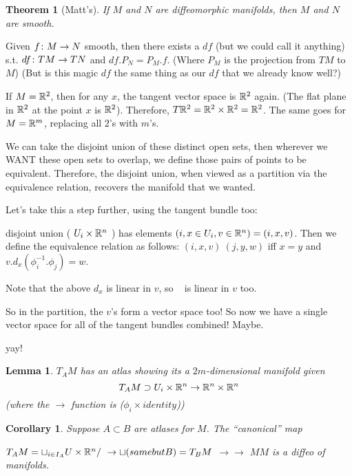 \documentclass[11pt]{amsbook}
\newenvironment{dateenv}{
	\vspace{1em}
}{
	\vspace{1em}
}
\newcommand{\mydate}[4]{
	\newdate{#1}{#2}{#3}{#4}
	\begin{dateenv}
		\hfill\displaydate{#1}
	\end{dateenv}
}
\theoremstyle{mystyle} %
\newtheorem{thrm}[thm]{Theorem}
\newtheorem{coro}[thm]{Corollary}
\newtheorem{lemm}[thm]{Lemma}
\numberwithin{thm}{section}
\newcommand{\x}{\times}
\begin{document}
\begin{thrm}[Matt's]
	If $M$ and $N$ are diffeomorphic manifolds, then $M$ and $N$ are smooth.
\end{thrm}


\mydate{d1}{21}{9}{2016}

Given $f\colon M \to N$ smooth, then there exists a $df$ (but we could call it anything) s.t. $df \colon TM \to TN$ and $df.P_N = P_M.f$.  (Where $P_M$ is the projection from $TM$ to $M$)  (But is this magic $df$ the same thing as our $df$ that we already know well?)

\begin{example}
	If $M = {\mathbb R}^2$, then for any $x$, the tangent vector space is ${\mathbb R}^2$ again.  (The flat plane in ${\mathbb R}^2$ at the point $x$ is ${\mathbb R}^2$).  Therefore, $T{\mathbb R}^2 = {\mathbb R}^2 \times {\mathbb R}^2 = {\mathbb R}^2$.  The same goes for $M = {\mathbb R}^m$, replacing all $2$'s with $m$'s.
\end{example}

We can take the disjoint union of these distinct open sets, then wherever we WANT these open sets to overlap, we define those pairs of points to be equivalent.  Therefore, the disjoint union, when viewed as a partition via the equivalence relation, recovers the manifold that we wanted.

Let's take this a step further, using the tangent bundle too:

disjoint union ( $U_i \times {\mathbb R}^n$ ) has elements $(i, x \in U_i, v \in {\mathbb R}^n) = (i, x, v)$.
Then we define the equivalence relation as follows:
$(i, x, v) ~ (j, y, w)$ iff $x=y$ and $v.d_x(\phi_i^{-1}.\phi_j) = w$.

Note that the above $d_x$ is linear in $v$, so ~ is linear in $v$ too.

So in the partition, the $v$'s form a vector space too!  So now we have a single vector space for all of the tangent bundles combined!  Maybe.

yay!

\begin{lemm}
	$T_A M$ has an atlas showing its a $2m$-dimensional manifold given
	$$T_A M \supset U_i \x \R^n \to \R^n \x \R^n$$ (where the $\to$ function is ($\phi_i \times identity$))
\end{lemm}
\begin{coro}
	Suppose $A \subset B$ are atlases for $M$.  The ``canonical'' map

	$T_A M = \sqcup_{i \in I_A} U \times {\mathbb R}^n/~ \to \sqcup (same but B) = T_B M$
				$\to										\to$
				$M 										M$
	is a diffeo of manifolds.
\end{coro}
\end{document}
